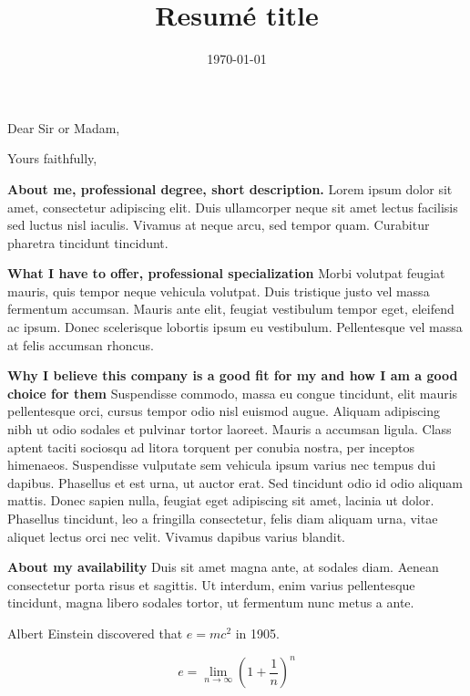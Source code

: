 \documentclass[11pt,a4paper,sans,spanish]{mymoderncv}
\title{Resum\'e title}%
\begin{document}

\date{\today}
\opening{Dear Sir or Madam,}
\closing{Yours faithfully,}
{}%
\makelettertitle

\textbf{About me, professional degree, short description.}
Lorem ipsum dolor sit amet, consectetur adipiscing elit. Duis ullamcorper neque sit amet lectus facilisis sed luctus nisl iaculis. Vivamus at neque arcu, sed tempor quam. Curabitur pharetra tincidunt tincidunt.

\textbf{What I have to offer, professional specialization}
Morbi volutpat feugiat mauris, quis tempor neque vehicula volutpat. Duis tristique justo vel massa fermentum accumsan. Mauris ante elit, feugiat vestibulum tempor eget, eleifend ac ipsum. Donec scelerisque lobortis ipsum eu vestibulum. Pellentesque vel massa at felis accumsan rhoncus.

\textbf{Why I believe this company is a good fit for my and how I am a good choice for them}
Suspendisse commodo, massa eu congue tincidunt, elit mauris pellentesque orci, cursus tempor odio nisl euismod augue. Aliquam adipiscing nibh ut odio sodales et pulvinar tortor laoreet. Mauris a accumsan ligula. Class aptent taciti sociosqu ad litora torquent per conubia nostra, per inceptos himenaeos. Suspendisse vulputate sem vehicula ipsum varius nec tempus dui dapibus. Phasellus et est urna, ut auctor erat. Sed tincidunt odio id odio aliquam mattis. Donec sapien nulla, feugiat eget adipiscing sit amet, lacinia ut dolor. Phasellus tincidunt, leo a fringilla consectetur, felis diam aliquam urna, vitae aliquet lectus orci nec velit. Vivamus dapibus varius blandit.

\textbf{About my availability}
Duis sit amet magna ante, at sodales diam. Aenean consectetur porta risus et sagittis. Ut interdum, enim varius pellentesque tincidunt, magna libero sodales tortor, ut fermentum nunc metus a ante.

Albert Einstein discovered that $e=mc^2$ in 1905.

\[ e=\lim_{n \to \infty} \left(1+\frac{1}{n}\right)^n \]

\makeletterclosing

\end{document}
